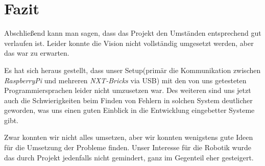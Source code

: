 \chapter{Fazit}
Abschließend kann man sagen, dass das Projekt den Umständen entsprechend gut verlaufen ist. Leider konnte die Vision nicht vollständig umgesetzt werden, aber das war zu erwarten.

Es hat sich heraus gestellt, dass unser Setup(primär die Kommunikation zwischen \textit{RaspberryPi} und mehreren \textit{NXT-Bricks} via USB) mit den von uns getesteten Programmiersprachen leider nicht umzusetzen war. Des weiteren sind uns jetzt auch die Schwierigkeiten beim Finden von Fehlern in solchen System deutlicher geworden, was uns einen guten Einblick in die Entwicklung eingebetter Systeme gibt.

Zwar konnten wir nicht alles umsetzen, aber wir konnten wenigstens gute Ideen für die Umsetzung der Probleme finden. Unser Interesse für die Robotik wurde das durch Projekt jedenfalls nicht gemindert, ganz im Gegenteil eher gesteigert.